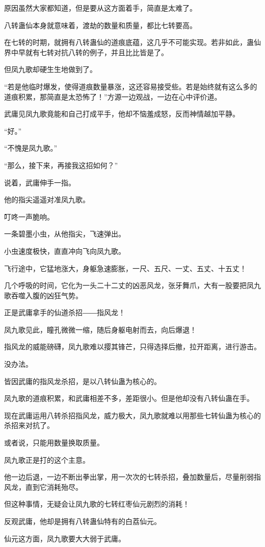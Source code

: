 \begin{this_body}
原因虽然大家都知道，但是要从这方面着手，简直是太难了。

八转蛊仙本身就意味着，渡劫的数量和质量，都比七转要高。

在七转的时期，就拥有八转蛊仙的道痕底蕴，这几乎不可能实现。若非如此，蛊仙界中早就有七转对抗八转的例子，并且比比皆是了。

但凤九歌却硬生生地做到了。

“若是他临时爆发，使得道痕数量暴涨，这还容易接受些。若是始终就有这么多的道痕积累，那简直是太恐怖了！”方源一边观战，一边在心中评价道。

武庸见凤九歌竟能和自己打成平手，他却不恼羞成怒，反而神情越加平静。

“好。”

“不愧是凤九歌。”

“那么，接下来，再接我这招如何？”

说着，武庸伸手一指。

他的指尖遥遥对准凤九歌。

叮咚一声脆响。

一条碧墨小虫，从他指尖，飞速弹出。

小虫速度极快，直直冲向飞向凤九歌。

飞行途中，它猛地涨大，身躯急速膨胀，一尺、五尺、一丈、五丈、十五丈！

几个呼吸的时间，它化为一头二十二丈的凶恶风龙，张牙舞爪，大有一股要把凤九歌吞噬入腹的凶狂气势。

正是武庸拿手的仙道杀招――指风龙！

凤九歌见此，瞳孔微微一缩，随后身躯电射而去，向后爆退！

指风龙的威能磅礴，凤九歌难以撄其锋芒，只得选择后撤，拉开距离，进行游击。

没办法。

皆因武庸的指风龙杀招，是以八转仙蛊为核心的。

凤九歌的道痕积累，和武庸相差不多，差距很小。但是他却没有八转仙蛊在手。

现在武庸运用八转杀招指风龙，威力极大，凤九歌就难以用那些七转仙蛊为核心的杀招来对抗了。

或者说，只能用数量换取质量。

凤九歌正是打的这个主意。

他一边后退，一边不断出拳出掌，用一次次的七转杀招，叠加数量后，尽量削弱指风龙，直到它消耗殆尽。

但这种事情，无疑会让凤九歌的七转红枣仙元剧烈的消耗！

反观武庸，他却是拥有八转蛊仙特有的白荔仙元。

仙元这方面，凤九歌要大大弱于武庸。


\end{this_body}
